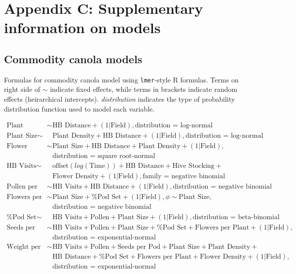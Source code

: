 \clearpage

\section*{Appendix C: Supplementary information on models}

\subsection*{Commodity canola models}

Formulas for commodity canola model using \texttt{lmer}-style R formulas. Terms on right side of $\sim$ indicate fixed effects, while terms in brackets indicate random effects (heirarchical intercepts). \textit{distribution} indicates the type of probability distribution function used to model each variable.

\begin{align*}
    \text{Plant Density} \sim & \text{HB Distance} + (1|\text{Field}), \text{distribution = log-normal} \\
    \text{Plant Size} \sim & \text{Plant Density} + \text{HB Distance} + (1|\text{Field}),\text{distribution = log-normal} \\
    \text{Flower Density} \sim & \text{Plant Size} + \text{HB Distance} + \text{Plant Density} + (1|\text{Field}),\\
    &   \text{distribution = square root-normal} \\
    \text{HB Visits} \sim & \text{offset}(log(\text{Time})) + \text{HB Distance} + \text{Hive Stocking} + \\ 
    &   \text{Flower Density} + (1|\text{Field}), \text{family = negative binomial}\\
    \text{Pollen per Stigma} \sim & \text{HB Visits} + \text{HB Distance} + (1|\text{Field}), \text{distribution = negative binomial} \\
    \text{Flowers per Plant} \sim & \text{Plant Size} + \text{\% Pod Set} + (1|\text{Field}), \phi \sim \text{Plant Size}, \\
    &     \text{distribution = negative binomial} \\
    \text{\% Pod Set} \sim & \text{HB Visits} + \text{Pollen} + \text{Plant Size} + (1|\text{Field}), \text{distribution = beta-binomial} \\
    \text{Seeds per Pod} \sim & \text{HB Visits} + \text{Pollen} + \text{Plant Size} + \text{\% Pod Set} + \text{Flowers per Plant} + (1|\text{Field}),\\ 
    &   \text{distribution = exponential-normal} \\
    \text{Weight per Seed} \sim & \text{HB Visits} + \text{Pollen} + \text{Seeds per Pod} + \text{Plant Size} + \text{Plant Density} +\\
    &   \text{HB Distance} + \text{\% Pod Set} + \text{Flowers per Plant} + \text{Flower Density} + (1|\text{Field}),\\
    &   \text{distribution = exponential-normal} \\
\end{align*}

